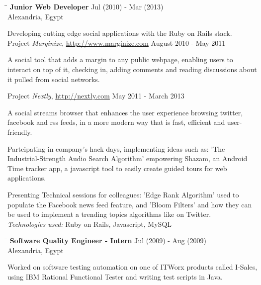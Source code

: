 \documentclass{res}
\newenvironment{details}{\vspace*{-4pt} \begin{list}{\topsep 0pt \itemsep -2pt}}{\vspace*{4pt}\end{list}}
\begin{document}
\begin{resume}
   \begin{tabbing}
   \hspace{2.7in}\= \hspace{1.8in}\= \kill %
    {\bf Junior Web Developer}\> \hfill Jul (2010) - Mar (2013)\\
                                    \>Alexandria, Egypt
   \end{tabbing}\vspace{-20pt}      %
   Developing cutting edge social applications with the Ruby on Rails stack.\\
   Project \textit{Marginize}, \url{http://www.marginize.com} {August 2010 - May 2011}
   \begin{details}
   \item A social tool that adds a margin to any public webpage, enabling users to interact on top of it, checking in, adding comments and reading discussions about it pulled from social networks.
   \end{details}
   Project \textit{Nextly}, \url{http://nextly.com} {May 2011 - March 2013}
   \begin{details}
   \item A social streams browser that enhances the user experience browsing twitter, facebook and rss feeds, in a more modern way that is fast, efficient and user-friendly.
   \end{details}
   Partcipating in company's hack days, implementing ideas such as: 'The Industrial-Strength Audio Search Algorithm' empowering Shazam, an Android Time tracker app, a javascript tool to easily create guided tours for web applications.

   Presenting Technical sessions for colleagues: 'Edge Rank Algorithm' used to populate the Facebook news feed feature, and 'Bloom Filters' and how they can be used to implement a trending topics algorithms like on Twitter.\\
    {\sl Technologies used:} Ruby on Rails, Javascript, MySQL

   \begin{tabbing}
   \hspace{2.7in}\= \hspace{1.8in}\= \kill %
    {\bf Software Quality Engineer - Intern}\> \hfill Jul (2009) - Aug (2009)\\
                                    \>Alexandria, Egypt
   \end{tabbing}\vspace{-20pt}      %
   Worked on software testing automation on one of ITWorx products called I-Sales, using IBM Rational Functional Tester and writing test scripts in Java.


\end{resume}
\end{document}

